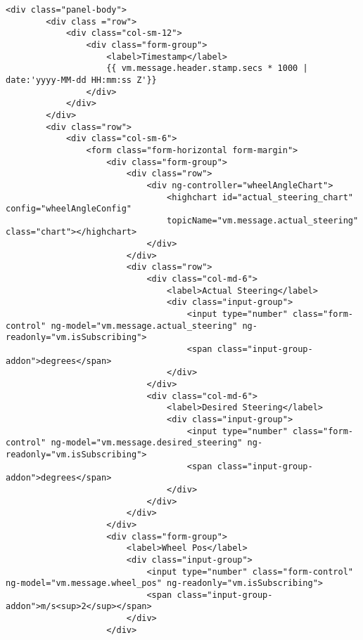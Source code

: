 \begin{lstlisting}[breaklines=true,basicstyle=\tiny]
    <div class="panel-body">
        <div class ="row">
            <div class="col-sm-12">
                <div class="form-group">
                    <label>Timestamp</label>
                    {{ vm.message.header.stamp.secs * 1000 | date:'yyyy-MM-dd HH:mm:ss Z'}}
                </div>
            </div>
        </div>
        <div class="row">
            <div class="col-sm-6">
                <form class="form-horizontal form-margin">
                    <div class="form-group">
                        <div class="row">
                            <div ng-controller="wheelAngleChart">
                                <highchart id="actual_steering_chart" config="wheelAngleConfig" 
                                topicName="vm.message.actual_steering" class="chart"></highchart>
                            </div>
                        </div>
                        <div class="row">
                            <div class="col-md-6">
                                <label>Actual Steering</label>
                                <div class="input-group">
                                    <input type="number" class="form-control" ng-model="vm.message.actual_steering" ng-readonly="vm.isSubscribing">
                                    <span class="input-group-addon">degrees</span>
                                </div>
                            </div>
                            <div class="col-md-6">
                                <label>Desired Steering</label>
                                <div class="input-group">
                                    <input type="number" class="form-control" ng-model="vm.message.desired_steering" ng-readonly="vm.isSubscribing">
                                    <span class="input-group-addon">degrees</span>
                                </div>
                            </div>
                        </div>
                    </div>
                    <div class="form-group">
                        <label>Wheel Pos</label>
                        <div class="input-group">
                            <input type="number" class="form-control" ng-model="vm.message.wheel_pos" ng-readonly="vm.isSubscribing">
                            <span class="input-group-addon">m/s<sup>2</sup></span>
                        </div>
                    </div>


\end{lstlisting}
